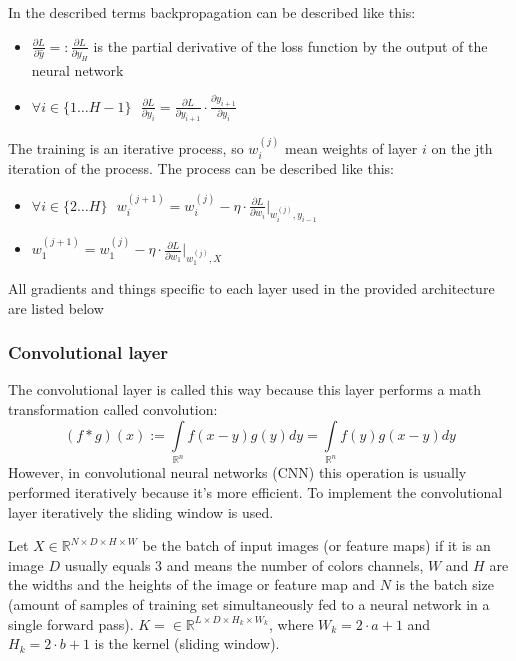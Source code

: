 In the described terms backpropagation can be described like this:
\begin{itemize}
    \item $\displaystyle\frac{\partial L}{\partial \hat{y}} =: \frac{\partial L}{\partial y_H}$ is the partial derivative of the loss function by the output of the neural network
    \item $\displaystyle \forall i \in \{1\dots H-1\}\text{ } \frac{\partial L}{\partial y_i} = \frac{\partial L}{\partial y_{i + 1}} \cdot \frac{\partial y_{i + 1}}{\partial y_i}$
\end{itemize}
The training is an iterative process, so $w_i^{(j)}$ mean weights of layer $i$ on the jth iteration of the process. The process can be described like this:
\begin{itemize}
    \item $\displaystyle \forall i \in \{2\dots H\} \text{ }w_i^{(j+1)} = w_i^{(j)} - \eta \cdot \frac{\partial L}{\partial w_i} \Big|_{w_i^{(j)}, y_{i-1}}$
    \item $\displaystyle w_1^{(j+1)} = w_1^{(j)} - \eta \cdot \frac{\partial L}{\partial w_1} \Big|_{w_1^{(j)}, X}$
\end{itemize}

All gradients and things specific to each layer used in the provided architecture are listed below

\subsubsection{Convolutional layer}
The convolutional layer is called this way because this layer performs a math transformation called convolution:
\[(f * g)(x) := \int\limits_{\mathbb{R}^n}f(x-y)g(y)dy= \int\limits_{\mathbb{R}^n}f(y)g(x-y)dy\]
However, in convolutional neural networks (CNN) this operation is usually performed iteratively because it's more efficient.
To implement the convolutional layer iteratively the sliding window is used.

Let $X \in \mathbb{R}^{N\times D \times H \times W}$ be the batch of input images (or feature maps) if it is an image $D$ usually equals $3$ and means the number of colors channels, 
$W$ and $H$ are the widths and the heights of the image or feature map and $N$ is the batch size (amount of samples of training set simultaneously fed to a neural network in 
a single forward pass).
$K = \in \mathbb{R}^{L \times D \times H_k \times W_k}$, where $W_k = 2\cdot a+1$ and $H_k = 2\cdot b+1$ is the kernel (sliding window).

